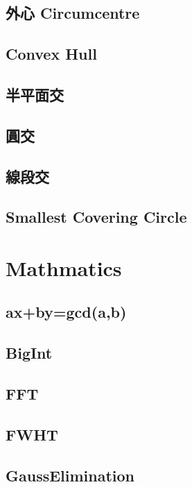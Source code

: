 \subsection{外心 Circumcentre}

\subsection{Convex Hull}

\subsection{半平面交}

\subsection{圓交}

\subsection{線段交}

\subsection{Smallest Covering Circle}


\section{Mathmatics}

\subsection{ax+by=gcd(a,b)}

\subsection{BigInt}

\subsection{FFT}

\subsection{FWHT}

\subsection{GaussElimination}

